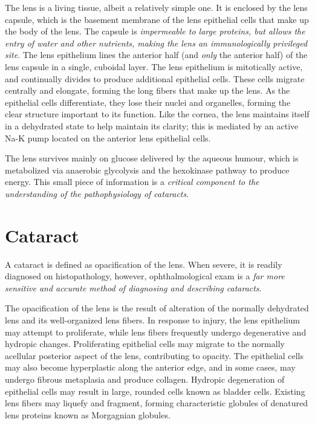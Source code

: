 \documentclass[openany]{book}
\begin{document}
The lens is a living tissue, albeit a relatively simple one. It is
enclosed by the lens capsule, which is the basement membrane of the lens
epithelial cells that make up the body of the lens. The capsule is
\emph{impermeable to large proteins, but allows the entry of water and
other nutrients, making the lens an immunologically privileged site}.
The lens epithelium lines the anterior half (and \emph{only} the
anterior half) of the lens capsule in a single, cuboidal layer. The lens
epithelium is mitotically active, and continually divides to produce
additional epithelial cells. These cells migrate centrally and elongate,
forming the long fibers that make up the lens. As the epithelial cells
differentiate, they lose their nuclei and organelles, forming the clear
structure important to its function. Like the cornea, the lens maintains
itself in a dehydrated state to help maintain its clarity; this is
mediated by an active Na-K pump located on the anterior lens epithelial
cells.

The lens survives mainly on glucose delivered by the aqueous humour,
which is metabolized via anaerobic glycolysis and the hexokinase pathway
to produce energy. This small piece of information is a \emph{critical
component to the understanding of the pathophysiology of cataracts}.

\section{Cataract}\label{cataract}

A cataract is defined as opacification of the lens. When severe, it is
readily diagnosed on histopathology, however, ophthalmological exam is a
\emph{far more sensitive and accurate method of diagnosing and
describing cataracts}.

The opacification of the lens is the result of alteration of the
normally dehydrated lens and its well-organized lens fibers. In response
to injury, the lens epithelium may attempt to proliferate, while lens
fibers frequently undergo degenerative and hydropic changes.
Proliferating epithelial cells may migrate to the normally acellular
posterior aspect of the lens, contributing to opacity. The epithelial
cells may also become hyperplastic along the anterior edge, and in some
cases, may undergo fibrous metaplasia and produce collagen. Hydropic
degeneration of epithelial cells may result in large, rounded cells
known as bladder cells. Existing lens fibers may liquefy and fragment,
forming characteristic globules of denatured lens proteins known as
Morgagnian globules.
\end{document}
